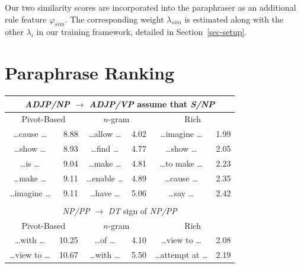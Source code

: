 \documentclass[11pt]{article}
\begin{document}
Our two similarity scores are incorporated into the paraphraser as an
additional rule feature $\varphi_{\mathit{sim}}$. The corresponding
weight $\lambda_{\mathit{sim}}$ is estimated along with the other
$\lambda_i$ in our training framework, detailed in
Section~\ref{sec-setup}.


\section{Paraphrase Ranking}
\label{sec-ranking}

\begin{table}[!t]
\begin{center}
\begin{tabular}{|cr|cr|cr|}
  \hline
  \multicolumn{6}{|c|}{\emph{ADJP/NP} $\rightarrow$ \emph{ADJP/VP}
    assume that \emph{S/NP}} \\
  \hline
  \multicolumn{2}{|c|}{Pivot-Based} &
  \multicolumn{2}{c|}{$n$-gram} &
  \multicolumn{2}{c|}{Rich} \\
  \hline

  \ldots cause \ldots & 8.88 &
  \ldots allow \ldots & 4.02 &
  \ldots imagine \ldots & 1.99 \\

  \ldots show \ldots & 8.93 &
  \ldots find \ldots & 4.77 &
  \ldots show \ldots & 2.05 \\

  \ldots is \ldots & 9.04 &
  \ldots make \ldots & 4.81 &
  \ldots to make \ldots & 2.23 \\

  \ldots make \ldots & 9.11 &
  \ldots enable \ldots & 4.89 &
  \ldots cause \ldots & 2.35 \\

  \ldots imagine \ldots & 9.11 &
  \ldots have \ldots & 5.06 &
  \ldots say \ldots & 2.42 \\

  \hline
  \multicolumn{6}{c}{} \\
  \hline
  \multicolumn{6}{|c|}{\emph{NP/PP} $\rightarrow$ \emph{DT}
    sign of \emph{NP/PP}} \\
  \hline
  \multicolumn{2}{|c|}{Pivot-Based} &
  \multicolumn{2}{c|}{$n$-gram} &
  \multicolumn{2}{c|}{Rich} \\
  \hline


  \ldots with \ldots & 10.25 &
  \ldots of \ldots & 4.10 &
  \ldots view to \ldots & 2.08 \\

  \ldots view to \ldots & 10.67 &
  \ldots with \ldots & 5.50 &
  \ldots attempt at \ldots & 2.19 \\


\end{tabular}
\end{center}
\end{table}
\end{document}
